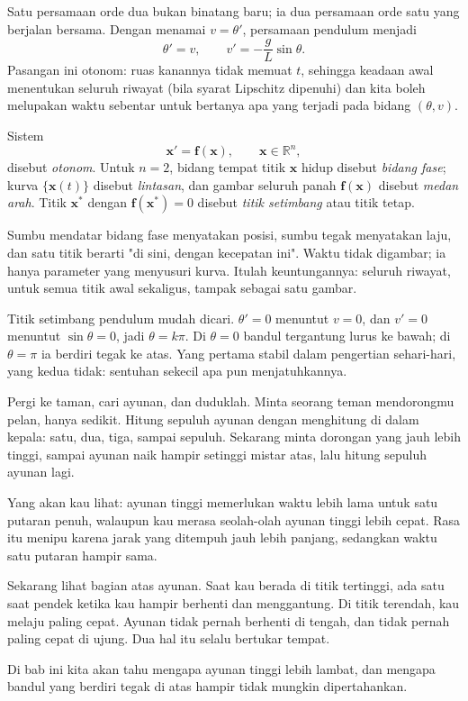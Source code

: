 Satu persamaan orde dua bukan binatang baru; ia dua persamaan orde satu yang
berjalan bersama. Dengan menamai $v=\theta'$, persamaan pendulum menjadi
\[
\theta'=v,\qquad v'=-\frac{g}{L}\sin\theta .
\]
Pasangan ini otonom: ruas kanannya tidak memuat $t$, sehingga keadaan awal
menentukan seluruh riwayat (bila syarat Lipschitz dipenuhi) dan kita boleh
melupakan waktu sebentar untuk bertanya apa yang terjadi pada bidang
$(\theta,v)$.

\begin{definisi}
Sistem
\[
\mathbf{x}'=\mathbf{f}(\mathbf{x}),\qquad \mathbf{x}\in\mathbb{R}^{n},
\]
disebut \emph{otonom}. Untuk $n=2$, bidang tempat titik $\mathbf{x}$ hidup
disebut \emph{bidang fase}; kurva $\{\mathbf{x}(t)\}$ disebut \emph{lintasan},
dan gambar seluruh panah $\mathbf{f}(\mathbf{x})$ disebut \emph{medan arah}.
Titik $\mathbf{x}^{*}$ dengan $\mathbf{f}(\mathbf{x}^{*})=0$ disebut
\emph{titik setimbang} atau titik tetap.
\end{definisi}

Sumbu mendatar bidang fase menyatakan posisi, sumbu tegak menyatakan laju, dan
satu titik berarti "di sini, dengan kecepatan ini". Waktu tidak digambar; ia
hanya parameter yang menyusuri kurva. Itulah keuntungannya: seluruh riwayat, untuk
semua titik awal sekaligus, tampak sebagai satu gambar.

Titik setimbang pendulum mudah dicari. $\theta'=0$ menuntut $v=0$, dan $v'=0$
menuntut $\sin\theta=0$, jadi $\theta=k\pi$. Di $\theta=0$ bandul tergantung
lurus ke bawah; di $\theta=\pi$ ia berdiri tegak ke atas. Yang pertama stabil
dalam pengertian sehari-hari, yang kedua tidak: sentuhan sekecil apa pun
menjatuhkannya.

\begin{untukanak}
Pergi ke taman, cari ayunan, dan duduklah. Minta seorang teman mendorongmu
pelan, hanya sedikit. Hitung sepuluh ayunan dengan menghitung di dalam kepala:
satu, dua, tiga, sampai sepuluh. Sekarang minta dorongan yang jauh lebih tinggi,
sampai ayunan naik hampir setinggi mistar atas, lalu hitung sepuluh ayunan lagi.

Yang akan kau lihat: ayunan tinggi memerlukan waktu lebih lama untuk satu
putaran penuh, walaupun kau merasa seolah-olah ayunan tinggi lebih cepat. Rasa
itu menipu karena jarak yang ditempuh jauh lebih panjang, sedangkan waktu satu
putaran hampir sama.

Sekarang lihat bagian atas ayunan. Saat kau berada di titik tertinggi, ada satu
saat pendek ketika kau hampir berhenti dan menggantung. Di titik terendah, kau
melaju paling cepat. Ayunan tidak pernah berhenti di tengah, dan tidak pernah
paling cepat di ujung. Dua hal itu selalu bertukar tempat.

Di bab ini kita akan tahu mengapa ayunan tinggi lebih lambat, dan mengapa
bandul yang berdiri tegak di atas hampir tidak mungkin dipertahankan.
\end{untukanak}

